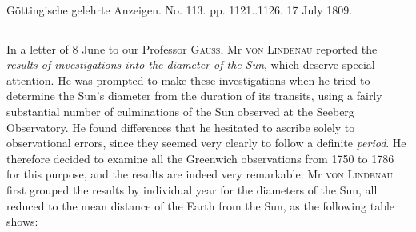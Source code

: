 \clearpage
{}
\hypertarget{native-524-lower}{}\label{native-524-lower}
\begin{center}\small Göttingische gelehrte Anzeigen. No. 113. pp. 1121..1126. 17 July 1809.\\[3pt]\rule{.72\linewidth}{.3pt}\end{center}

In a letter of 8 June to our Professor \textsc{Gauss}, Mr \textsc{von Lindenau} reported the \emph{results of investigations into the diameter of the Sun}, which deserve special attention. He was prompted to make these investigations when he tried to determine the Sun’s diameter from the duration of its transits, using a fairly substantial number of culminations of the Sun observed at the Seeberg Observatory. He found differences that he hesitated to ascribe solely to observational errors, since they seemed very clearly to follow a definite \emph{period}. He therefore decided to examine all the Greenwich observations from 1750 to 1786 for this purpose, and the results are indeed very remarkable. Mr \textsc{von Lindenau} first grouped the results by individual year for the diameters of the Sun, all reduced to the mean distance of the Earth from the Sun, as the following table shows:

